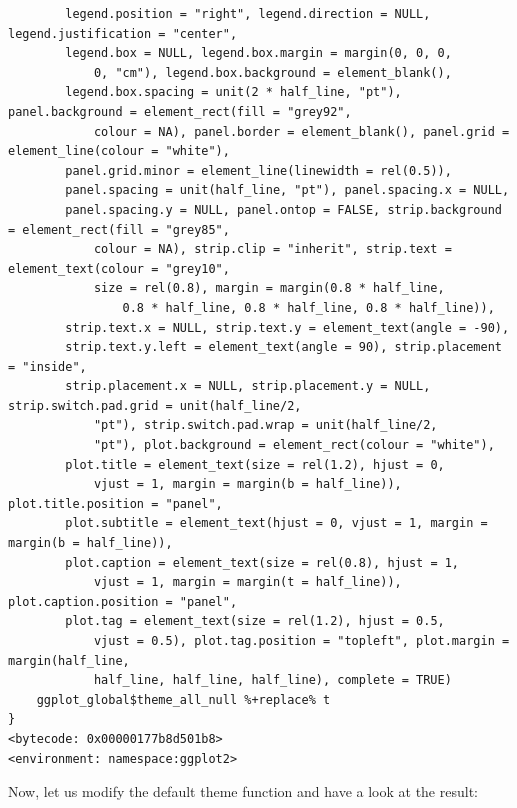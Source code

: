 \documentclass[
  letterpaper,
]{scrbook}
\begin{document}
\begin{verbatim}
        legend.position = "right", legend.direction = NULL, legend.justification = "center", 
        legend.box = NULL, legend.box.margin = margin(0, 0, 0, 
            0, "cm"), legend.box.background = element_blank(), 
        legend.box.spacing = unit(2 * half_line, "pt"), panel.background = element_rect(fill = "grey92", 
            colour = NA), panel.border = element_blank(), panel.grid = element_line(colour = "white"), 
        panel.grid.minor = element_line(linewidth = rel(0.5)), 
        panel.spacing = unit(half_line, "pt"), panel.spacing.x = NULL, 
        panel.spacing.y = NULL, panel.ontop = FALSE, strip.background = element_rect(fill = "grey85", 
            colour = NA), strip.clip = "inherit", strip.text = element_text(colour = "grey10", 
            size = rel(0.8), margin = margin(0.8 * half_line, 
                0.8 * half_line, 0.8 * half_line, 0.8 * half_line)), 
        strip.text.x = NULL, strip.text.y = element_text(angle = -90), 
        strip.text.y.left = element_text(angle = 90), strip.placement = "inside", 
        strip.placement.x = NULL, strip.placement.y = NULL, strip.switch.pad.grid = unit(half_line/2, 
            "pt"), strip.switch.pad.wrap = unit(half_line/2, 
            "pt"), plot.background = element_rect(colour = "white"), 
        plot.title = element_text(size = rel(1.2), hjust = 0, 
            vjust = 1, margin = margin(b = half_line)), plot.title.position = "panel", 
        plot.subtitle = element_text(hjust = 0, vjust = 1, margin = margin(b = half_line)), 
        plot.caption = element_text(size = rel(0.8), hjust = 1, 
            vjust = 1, margin = margin(t = half_line)), plot.caption.position = "panel", 
        plot.tag = element_text(size = rel(1.2), hjust = 0.5, 
            vjust = 0.5), plot.tag.position = "topleft", plot.margin = margin(half_line, 
            half_line, half_line, half_line), complete = TRUE)
    ggplot_global$theme_all_null %+replace% t
}
<bytecode: 0x00000177b8d501b8>
<environment: namespace:ggplot2>
\end{verbatim}

Now, let us modify the default theme function and have a look at the
result:
\end{document}
